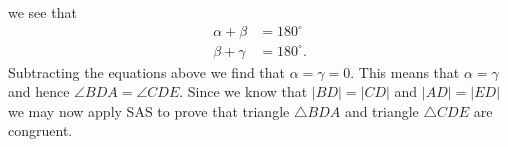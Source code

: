 \documentclass[handout,nooutcomes,noauthor,hints]{ximera}
\begin{document}
\begin{question}
\begin{freeResponse}
\begin{center}
    \end{center}
    we see that 
    \begin{align*}
      \alpha+\beta &= 180^\circ\\
      \beta + \gamma &= 180^\circ.
\end{align*}
Subtracting the equations above we find that $\alpha=\gamma = 0$.
This means that $\alpha = \gamma$ and hence $\angle BDA = \angle
CDE$. Since we know that $\left\vert BD\right\vert =\left\vert
CD\right\vert $ and $\left\vert AD\right\vert =\left\vert
ED\right\vert $ we may now apply SAS to prove that triangle $\triangle
BDA$ and triangle $\triangle CDE$ are congruent.
\end{freeResponse}
\end{question}

\mynewpage
\end{document}
